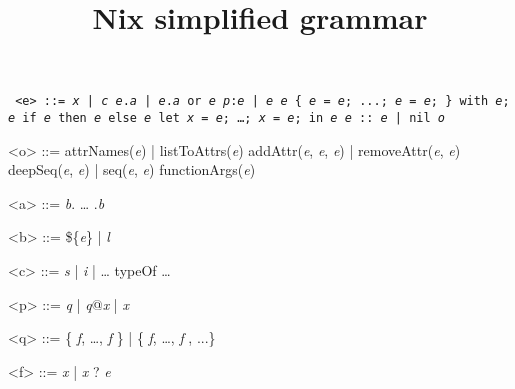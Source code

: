 \documentclass{article}
\title{Nix simplified grammar}
\date{}
\newcommand{\meta}[1]{\emph{\textsl{#1}}} %
\renewcommand{\|}{\textrm{|}}
\def\e/{\meta{e}}
\def\a/{\meta{a}}
\def\b/{\meta{b}}
\def\c/{\meta{c}}
\def\p/{\meta{p}}
\def\q/{\meta{q}}
\def\f/{\meta{f}}
\def\x/{\meta{x}}
\def\o/{\meta{o}}
\begin{document}
\maketitle{}

\begin{grammar}
  \tt
<e> ::=
    \x/ \| \c/
  \alt \e/.\a/ \| \e/.\a/ or \e/
  \alt \p/:\e/ \| \e/ \e/
  \alt \{ \e/ = \e/; ...; \e/ = \e/; \}
  \alt with \e/; \e/
  \alt if \e/ then \e/ else \e/
  \alt let \x/ = \e/; \ldots{;} \x/ = \e/; in \e/
  \alt \e/ :: \e/ \| nil
  \alt \o/

  <o> ::= attrNames(\e/) \| listToAttrs(\e/)
  \alt addAttr(\e/, \e/, \e/) \| removeAttr(\e/, \e/)
  \alt deepSeq(\e/, \e/) \| seq(\e/, \e/)
  \alt functionArgs(\e/)

<a> ::= \b/. \ldots{} .\b/

<b> ::= \$\{\e/\} \| \meta{l}

<c> ::= \meta{s} \| \meta{i} \| \ldots{}
  \alt typeOf
  \alt \ldots{}

<p> ::= \q/ \| \q/@\x/ \| \x/

<q> ::= \{ \f/, \ldots{,} \f/ \} \| \{ \f/, \ldots{,} \f/ , ...\}

<f> ::= \x/ \| \x/ ? \e/

\end{grammar}
\end{document}
